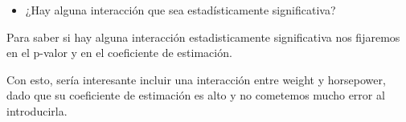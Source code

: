 \begin{itemize}

\item ¿Hay alguna interacción que sea estadísticamente significativa?

\end{itemize}

Para saber si hay alguna interacción estadisticamente significativa nos fijaremos en el p-valor y en el coeficiente de estimación.

Con esto, sería interesante incluir una interacción entre weight y horsepower, dado que su coeficiente de estimación es alto y no cometemos mucho error al introducirla. 

